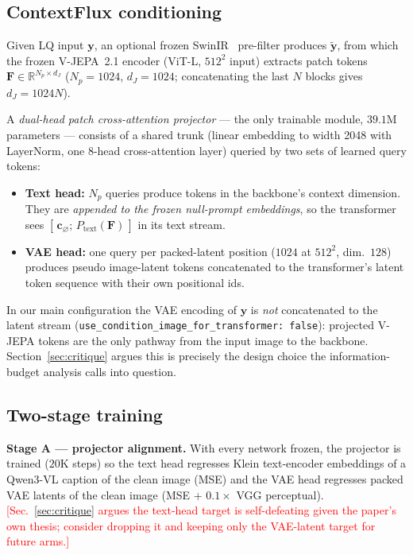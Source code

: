 \documentclass{article}
\newcommand{\authnote}[1]{\textcolor{red}{\footnotesize [#1]}}
\begin{document}
\subsection{ContextFlux conditioning}
\label{sec:contextflux}
Given LQ input $\mathbf{y}$, an optional frozen SwinIR~\cite{liang2021swinir} pre-filter produces $\tilde{\mathbf{y}}$, from which the frozen V-JEPA~2.1 encoder (ViT-L, $512^2$ input) extracts patch tokens $\mathbf{F}\in\mathbb{R}^{N_p\times d_J}$ ($N_p{=}1024$, $d_J{=}1024$; concatenating the last $N$ blocks gives $d_J{=}1024N$).

A \emph{dual-head patch cross-attention projector} — the only trainable module, $39.1$M parameters — consists of a shared trunk (linear embedding to width 2048 with LayerNorm, one 8-head cross-attention layer) queried by two sets of learned query tokens:
\begin{itemize}
\setlength\itemsep{0pt}
\item \textbf{Text head:} $N_p$ queries produce tokens in the backbone's context dimension. They are \emph{appended to the frozen null-prompt embeddings}, so the transformer sees $[\,\mathbf{c}_\varnothing;\, P_{\mathrm{text}}(\mathbf{F})\,]$ in its text stream.
\item \textbf{VAE head:} one query per packed-latent position ($1024$ at $512^2$, dim.\ $128$) produces pseudo image-latent tokens concatenated to the transformer's latent token sequence with their own positional ids.
\end{itemize}
In our main configuration the VAE encoding of $\mathbf{y}$ is \emph{not} concatenated to the latent stream (\texttt{use\_condition\_image\_for\_transformer: false}): projected V-JEPA tokens are the only pathway from the input image to the backbone. Section~\ref{sec:critique} argues this is precisely the design choice the information-budget analysis calls into question.

\subsection{Two-stage training}
\label{sec:training}
\textbf{Stage A — projector alignment.} With every network frozen, the projector is trained ($20$K steps) so the text head regresses Klein text-encoder embeddings of a Qwen3-VL caption of the clean image (MSE) and the VAE head regresses packed VAE latents of the clean image (MSE + $0.1{\times}$ VGG perceptual). \authnote{Sec.~\ref{sec:critique} argues the text-head target is self-defeating given the paper's own thesis; consider dropping it and keeping only the VAE-latent target for future arms.}
\end{document}
